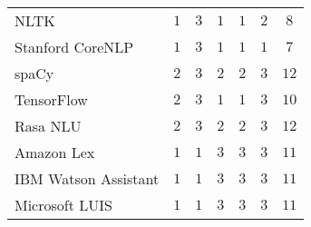 \begin{tabular}{l*6{|c}}
%
\toprule
%
&&&&&&\\
%
\midrule
NLTK&$1$&$3$&$1$&$1$&$2$&$8$\\
%
Stanford CoreNLP&$1$&$3$&$1$&$1$&$1$&$7$\\
%
spaCy&$2$&$3$&$2$&$2$&$3$&$12$\\
%
TensorFlow&$2$&$3$&$1$&$1$&$3$&$10$\\
%
Rasa NLU&$2$&$3$&$2$&$2$&$3$&$12$\\
%
Amazon Lex&$1$&$1$&$3$&$3$&$3$&$11$\\
%
IBM Watson Assistant&$1$&$1$&$3$&$3$&$3$&$11$\\
%
Microsoft LUIS&$1$&$1$&$3$&$3$&$3$&$11$\\
\bottomrule
\end{tabular}
